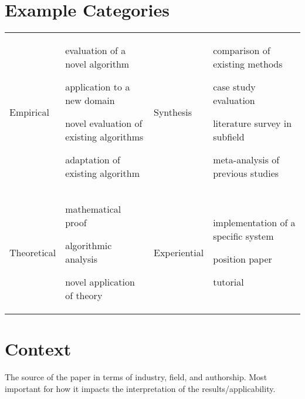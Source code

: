 \documentclass[oneside]{article} %
\begin{document}

\section*{Example Categories}
\label{sec:cat}

\begin{center}
\begin{tabular}{ p{1.5cm} p{6.5cm} p{1.5cm} p{6.5cm}}
 Empirical & \begin{checklist}
 \item evaluation of a novel algorithm
 \item application to a new domain
 \item novel evaluation of existing algorithms
 \item adaptation of existing algorithm
 \end{checklist}&
 Synthesis & \begin{checklist}
 \item comparison of existing methods
 \item case study evaluation
 \item literature survey in subfield
 \item meta-analysis of previous studies
 \end{checklist} \\
Theoretical & \begin{checklist}
\item mathematical proof
\item algorithmic analysis
\item novel application of theory
 \end{checklist} &
Experiential & \begin{checklist}
 \item implementation of a specific system
 \item position paper
 \item tutorial
 \end{checklist}\\
 \end{tabular}
 \end{center}
 
 \section*{Context}
 The source of the paper in terms of industry, field, and authorship. Most important for how it impacts the interpretation of the results/applicability.
 
\end{document}
